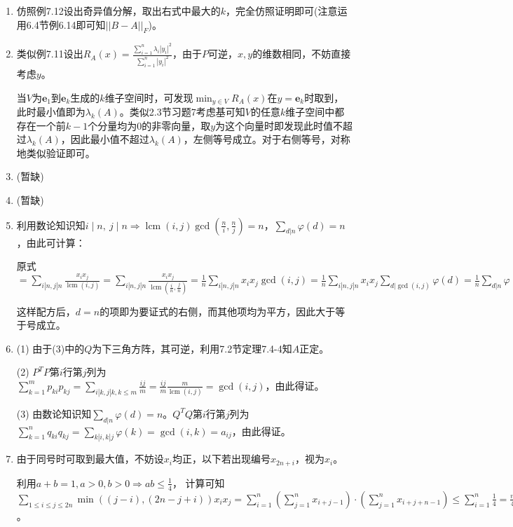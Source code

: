 \documentclass[a4paper,UTF8,fontset=windows]{ctexart}
\DeclareMathOperator{\lcm}{lcm}
\begin{document}
\begin{enumerate}
\item
仿照例7.12设出奇异值分解，取出右式中最大的$k$，完全仿照证明即可(注意运用6.4节例6.14即可知$||B-A||_F$)。

\item
类似例7.11设出$R_A(x)=\frac{\sum_{i=1}^n\lambda_i|y_i|^2}{\sum_{i=1}^n|y_i|^2}$，由于$P$可逆，$x,y$的维数相同，不妨直接考虑$y$。

当$V$为$\mathbf{e}_1$到$\mathbf{e}_k$生成的$k$维子空间时，可发现$\min_{y\in V}R_A(x)$在$y=\mathbf{e}_k$时取到，此时最小值即为$\lambda_k(A)$。类似2.3节习题7考虑基可知$V$的任意$k$维子空间中都存在一个前$k-1$个分量均为0的非零向量，取$y$为这个向量时即发现此时值不超过$\lambda_k(A)$，因此最小值不超过$\lambda_k(A)$，左侧等号成立。对于右侧等号，对称地类似验证即可。

\item
(暂缺)

\item
(暂缺)

\item
利用数论知识知$i\mid n,\ j\mid n\Rightarrow\lcm(i,j)\gcd\left(\frac{n}{i},\frac{n}{j}\right)=n$，$\sum_{d|n}\varphi(d)=n$，由此可计算：

原式$=\sum_{i|n,j|n}\frac{x_ix_j}{\lcm(i,j)}=\sum_{i|n,j|n}\frac{x_ix_j}{\lcm(\frac{i}{n},\frac{j}{n})}=\frac{1}{n}\sum_{i|n,j|n}x_ix_j\gcd(i,j)=\frac{1}{n}\sum_{i|n,j|n}x_ix_j\sum_{d|\gcd(i,j)}\varphi(d)=\frac{1}{n}\sum_{d|n}\varphi(d)\sum_{d|i|n,d|j|n}x_ix_j=\frac{1}{n}\sum_{d|n}\varphi(d)\Big(\sum_{d|i,i|n}x_i\Big)^2$

这样配方后，$d=n$的项即为要证式的右侧，而其他项均为平方，因此大于等于号成立。

\item
(1) 由于(3)中的$Q$为下三角方阵，其可逆，利用7.2节定理7.4-4知$A$正定。

(2) $P^TP$第$i$行第$j$列为$\sum_{k=1}^mp_{ki}p_{kj}=\sum_{i|k,j|k,k\le m}\frac{ij}{m}=\frac{ij}{m}\frac{m}{\lcm(i,j)}=\gcd(i,j)$，由此得证。

(3) 由数论知识知$\sum_{d|n}\varphi(d)=n$。$Q^TQ$第$i$行第$j$列为$\sum_{k=1}^nq_{ki}q_{kj}=\sum_{k|i,k|j}\varphi(k)=\gcd(i,k)=a_{ij}$，由此得证。

\item
由于同号时可取到最大值，不妨设$x_i$均正，以下若出现编号$x_{2n+i}$，视为$x_i$。

利用$a+b=1,a>0,b>0\Rightarrow ab\le\frac{1}{4}$，
计算可知$\sum_{1\le i\le j\le 2n}\min((j-i),(2n-j+i))x_ix_j=\sum_{i=1}^n\left(\sum_{j=1}^nx_{i+j-1}\right)\cdot\left(\sum_{j=1}^nx_{i+j+n-1}\right)\le\sum_{i=1}^n\frac{1}{4}=\frac{n}{4}$。


\end{enumerate}
\end{document}
